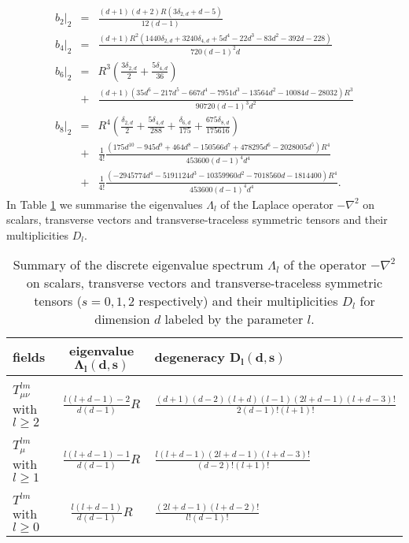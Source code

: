 \documentclass[notitlepage,eqsecnum,bm,amsmath,preprintnumbers,superscriptaddress,nofootinbib,aps,11pt]{revtex4-1}
\begin{document}
\begin{eqnarray} %
b_2|_{2} &=& \frac{(d+1) (d+2) R (3 \delta _{2,d}+d-5)}{12 (d-1)} 
\\
b_4|_{2} &=& \frac{(d+1) R^2 \left(1440 \delta _{2,d}+3240 \delta _{4,d}+5 d^4-22
  d^3-83 d^2-392 d-228\right)}{720 (d-1)^2 d} 
\\
b_6|_{2} &=& R^3 \left(\frac{3 \delta _{2,d}}{2}+\frac{5 \delta
  _{4,d}}{36}\right) \\
  &+&\frac{(d+1) \left(35 d^6-217 d^5-667 d^4-7951
  d^3-13564 d^2-10084 d-28032\right) R^3}{90720 (d-1)^3 d^2} \nonumber \\
  b_8|_{2} &=& R^4 \left(\frac{\delta _{2,d}}{2}+\frac{5 \delta
  _{4,d}}{288}+\frac{\delta _{6,d}}{175} +\frac{675 \delta
  _{8,d}}{175616}\right) \\
  &+& \frac{1}{4!}\frac{\left(175 d^{10}-945 d^9+464 d^8-150566
  d^7+478295 d^6-2028005 d^5 \right) R^4}{453600 (d-1)^4 d^4}  \nonumber \\
  &+& \frac{1}{4!}\frac{(-2945774 d^4-5191124 d^3-10359960
  d^2-7018560 d-1814400)R^4}{453600 (d-1)^4 d^4}. \nonumber
\end{eqnarray}
In Table \ref{Multiplicities} we summarise the eigenvalues $\Lambda_l$ of the Laplace operator $-\nabla^2$ on scalars, transverse vectors and transverse-traceless symmetric tensors and their multiplicities $D_l$.


\begin{center}
\begin{table*}[t]
\addtolength{\tabcolsep}{4pt}
\setlength{\extrarowheight}{8pt}
\centering
\begin{tabular}{G | c | G } 
\toprule
{}
\bf  fields & \bf  eigenvalue $\bm{\Lambda_l(d,s)}$ & \bf  degeneracy $\bm{D_l(d,s)}$ 
 \\[1ex] \midrule &&\\[-4mm]
$T^{lm}_{\mu\nu}$ with $l\geq2$ &  $\displaystyle\frac{l(l+d-1)-2}{d(d-1)}R$ & $\displaystyle\frac{(d+1)(d-2)(l+d)(l-1)(2l+d-1)(l+d-3)!}{2(d-1)!(l+1)!}$  
\\[4mm] \midrule &&\\[-4mm]
$T^{lm}_{\mu}$ with $l\geq1$ & $\displaystyle\frac{l(l+d-1)-1}{d(d-1)}R$ & $\displaystyle\frac{l(l+d-1)(2l+d-1)(l+d-3)!}{(d-2)!(l+1)!}$  
\\[4mm] \midrule &&\\[-4mm]
$T^{lm}$ with $l\geq0$ & $\displaystyle\frac{l(l+d-1)}{d(d-1)}R$ &  $\displaystyle\frac{(2l+d-1)(l+d-2)!}{l!(d-1)!}$   \\[4mm] 
\bottomrule
\end{tabular}  
\caption{Summary of the discrete eigenvalue spectrum $\Lambda_l$  
of the operator $-\nabla^2$ on scalars, transverse vectors and transverse-traceless symmetric tensors ($s=0,1,2$ respectively) 
and their multiplicities  $D_l$ for dimension $d$ labeled by the parameter $l$.
}\label{Multiplicities}
\end{table*} 
\end{center}
\end{document}
